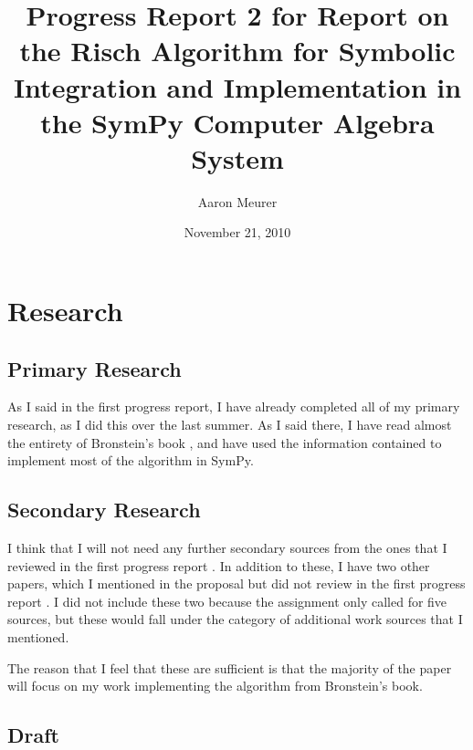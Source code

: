 \documentclass[12pt]{article}
\begin{document}
\title{Progress Report 2 for Report on the Risch Algorithm for Symbolic
Integration and Implementation in the Sym\-Py Computer Algebra System}
\author{Aaron Meurer}
\date{November 21, 2010}
\maketitle


\section{Research}
\subsection{Primary Research}
As I said in the first progress report, I have already completed all of
my primary research, as I did this over the last summer.  As I said
there, I have read almost the entirety of Bronstein's book
\cite{bronstein2005symbolic}, and have used the information contained to
implement most of the algorithm in Sym\-Py.

\subsection{Secondary Research}
I think that I will not need any further secondary sources from the ones
that I reviewed in the first progress report
\cite{bronstein1989simplification, davenport1984integration,
kauers2008integration, moses1971symbolic, risch1969problem}.  In
addition to these, I have two other papers, which I mentioned in the
proposal but did not review in the first progress report
\cite{roach1997meijerg, adamchik1990hypergeometric}.  I did not include
these two because the assignment only called for five sources, but these
would fall under the category of additional work sources that I
mentioned.

The reason that I feel that these are sufficient is that the majority of
the paper will focus on my work implementing the algorithm from
Bronstein's book.

\subsection{Draft}



\end{document}
